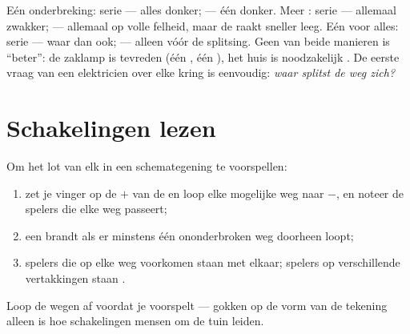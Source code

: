 \begin{remark}\label{rem:g5:series-parallel-circuits:compare}
Eén onderbreking: serie --- alles donker;  --- één 
donker. Meer : serie --- allemaal zwakker;  ---
allemaal op volle felheid, maar de  raakt sneller leeg. Eén
 voor alles: serie --- waar dan ook;  --- alleen
vóór de splitsing. Geen van beide manieren is ``beter'': de zaklamp is
tevreden  (één , één ), het huis is
noodzakelijk . De eerste vraag van een elektricien over elke
kring is eenvoudig: \emph{waar splitst de weg zich?}
\end{remark}

\section{Schakelingen lezen}

\begin{method}\label{met:g5:series-parallel-circuits:follow}
Om het lot van elk  in een schemategening te voorspellen:
\begin{enumerate}
  \item zet je vinger op de $+$ van de  en loop elke mogelijke
        weg naar $-$, en noteer de spelers die elke weg passeert;
  \item een  brandt als er minstens één ononderbroken weg
        doorheen loopt;
  \item spelers die op elke weg voorkomen staan  met
        elkaar; spelers op verschillende vertakkingen staan
        .
\end{enumerate}
Loop de wegen af voordat je voorspelt --- gokken op de vorm van de
tekening alleen is hoe schakelingen mensen om de tuin leiden.
\end{method}

